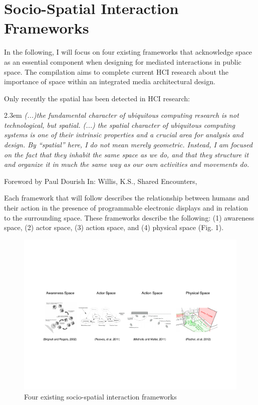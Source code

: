 
\section{Socio-Spatial Interaction Frameworks}

In the following, I will focus on four existing frameworks that acknowledge space as an essential component when designing for mediated interactions in public space. The compilation aims to complete current HCI research about the importance of space within an integrated media architectural design. 

Only recently the spatial has been detected in HCI research:

\begin{singlespace}
	\leftskip2.3em
		\rightskip\leftskip
\textit{\small (...)the fundamental character of ubiquitous computing research is not technological, but spatial. (...) the spatial character of ubiquitous computing systems is one of their intrinsic properties and a crucial area for analysis and design. 
By “spatial” here, I do not mean merely geometric. 
Instead, I am focused on the fact that they inhabit the same space as we do, and that they structure it and organize it in much the same way as our own activities and movements do.} 

\small Foreword by Paul Dourish In: Willis, K.S., Shared Encounters,
\end{singlespace}



Each framework that will follow describes the relationship between humans and their action in the presence of programmable electronic displays and in relation to the surrounding space.
These frameworks describe the following: (1) awareness space, (2) actor space, (3) action space, and (4) physical space (Fig. 1).


\begin{figure}[htp]
\centering
\includegraphics[width=\textwidth]{Illustrations/SpatialFrameworks.pdf}
\caption{Four existing socio-spatial interaction frameworks}
\label{fig:Background-frameworks}
\end{figure}

